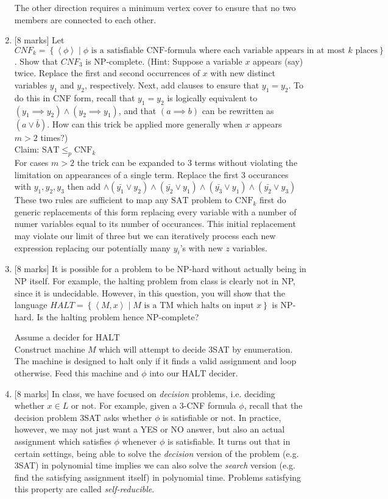 \documentclass{article}
\newcommand{\class}[1]{\text{#1}}
\newcommand{\set}[1]{{\left\{#1\right\}}}    %
\newcommand{\enc}[1]{\left<#1\right>}
\begin{document}
\begin{enumerate}
The other direction requires a minimum vertex cover to ensure that no two members are connected to each other. 

    \item {[8 marks]} Let $CNF_k=\set{\enc{\phi}\mid\phi\text{ is a satisfiable CNF-formula where each variable appears in at most }k\text{ places}}$. Show that ${CNF}_3$ is NP-complete. (Hint: Suppose a variable $x$ appears (say) twice. Replace the first and second occurrences of $x$ with new distinct variables $y_1$ and $y_2$, respectively. Next, add clauses to ensure that $y_1=y_2$. To do this in CNF form, recall that $y_1=y_2$ is logically equivalent to $(y_1\implies y_2)\wedge(y_2\implies y_1)$, and that $(a\implies b)$ can be rewritten as $(a\vee \bar{b})$. How can this trick be applied more generally when $x$ appears $m>2$ times?) \\
    Claim: $\class{SAT} \leq_p \class{CNF}_k$ \\
    For cases $m>2$ the trick can be expanded to 3 terms without violating the limitation on appearances of a single term. Replace the first 3 occurances with $y_1, y_2, y_3$ then add $\wedge (\bar{y_1} \vee y_2) \wedge (\bar{y_2} \vee y_1) \wedge (\bar{y_3} \vee y_1) \wedge (\bar{y_2} \vee y_3)$ These two rules are sufficient to map any $\class{SAT}$ problem to $\class{CNF}_k$ first do generic replacements of this form replacing every variable with a number of numer variables equal to its number of occurances. This initial replacement may violate our limit of three but we can iteratively process each new expression replacing our potentially many $y_i$'s with new $z$ variables.
    
    \item {[8 marks]} It is possible for a problem to be NP-hard without actually being in NP itself. For example, the halting problem from class is clearly not in NP, since it is undecidable. However, in this question, you will show that the language $HALT=\set{\enc{M,x}\mid M\text{ is a TM which halts on input }x}$ is NP-hard. Is the halting problem hence NP-complete?
    
Assume a decider for $\class{HALT}$\\
Construct machine $M$ which will attempt to decide 3SAT by enumeration. The machine is designed to halt only if it finds a valid assignment and loop otherwise. Feed this machine and $\phi$ into our $\class{HALT}$ decider. 
    
    \item {[8 marks]} In class, we have focused on \emph{decision} problems, i.e. deciding whether $x\in L$ or not. For example, given a 3-CNF formula $\phi$, recall that the decision problem 3SAT asks whether $\phi$ is satisfiable or not. In practice, however, we may not just want a YES or NO answer, but also an actual assignment which satisfies $\phi$ whenever $\phi$ is satisfiable. It turns out that in certain settings, being able to solve the \emph{decision} version of the problem (e.g. 3SAT) in polynomial time implies we can also solve the \emph{search} version (e.g. find the satisfying assignment itself) in polynomial time. Problems satisfying this property are called \emph{self-reducible}.


\end{enumerate}
\end{document}
